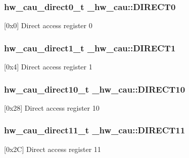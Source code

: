 \subsubsection[{\texorpdfstring{D\+I\+R\+E\+C\+T0}{DIRECT0}}]{ {\bf hw\+\_\+cau\+\_\+direct0\+\_\+t} \+\_\+hw\+\_\+cau\+::\+D\+I\+R\+E\+C\+T0}\hypertarget{struct__hw__cau_a0678085a1eb5ee8ca79b1d0e0aa6a6c9}{}\label{struct__hw__cau_a0678085a1eb5ee8ca79b1d0e0aa6a6c9}
\mbox{[}0x0\mbox{]} Direct access register 0 
\subsubsection[{\texorpdfstring{D\+I\+R\+E\+C\+T1}{DIRECT1}}]{ {\bf hw\+\_\+cau\+\_\+direct1\+\_\+t} \+\_\+hw\+\_\+cau\+::\+D\+I\+R\+E\+C\+T1}\hypertarget{struct__hw__cau_adb2390900301203661b50af09a50df9f}{}\label{struct__hw__cau_adb2390900301203661b50af09a50df9f}
\mbox{[}0x4\mbox{]} Direct access register 1 
\subsubsection[{\texorpdfstring{D\+I\+R\+E\+C\+T10}{DIRECT10}}]{ {\bf hw\+\_\+cau\+\_\+direct10\+\_\+t} \+\_\+hw\+\_\+cau\+::\+D\+I\+R\+E\+C\+T10}\hypertarget{struct__hw__cau_a9f0fc8f6c1f85fba2b75837004ba56a7}{}\label{struct__hw__cau_a9f0fc8f6c1f85fba2b75837004ba56a7}
\mbox{[}0x28\mbox{]} Direct access register 10 
\subsubsection[{\texorpdfstring{D\+I\+R\+E\+C\+T11}{DIRECT11}}]{ {\bf hw\+\_\+cau\+\_\+direct11\+\_\+t} \+\_\+hw\+\_\+cau\+::\+D\+I\+R\+E\+C\+T11}\hypertarget{struct__hw__cau_a72631fb47910d24e707026d33944f296}{}\label{struct__hw__cau_a72631fb47910d24e707026d33944f296}
\mbox{[}0x2C\mbox{]} Direct access register 11 
